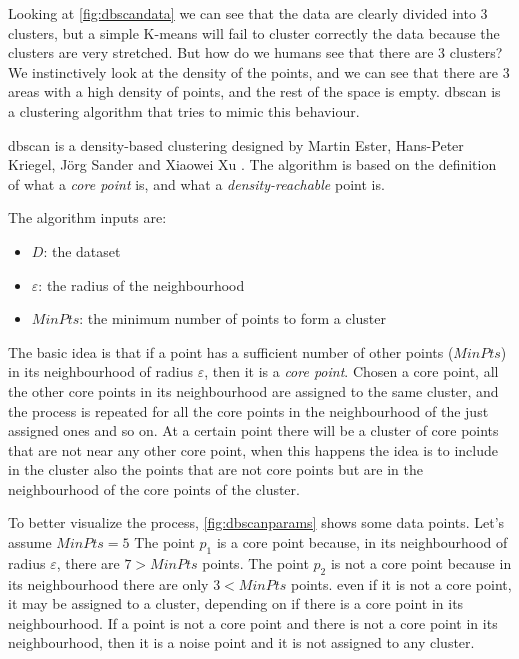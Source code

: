 Looking at \autoref{fig:dbscandata} we can see that the data are clearly divided into $3$ clusters, but a simple K-means will fail to cluster correctly the data because the clusters are very stretched. 
But how do we humans see that there are $3$ clusters? We instinctively look at the density of the points, and we can see that there are $3$ areas with a high density of points, and the rest of the space is empty. \gls{dbscan} is a clustering algorithm that tries to mimic this behaviour.

\gls{dbscan} is a density-based clustering designed by Martin Ester, Hans-Peter Kriegel, Jörg Sander and Xiaowei Xu \cite{dbscan}. The algorithm is based on the definition of what a  \emph{core point} is, and what a \emph{density-reachable} point is.


The algorithm inputs are:
\begin{itemize}
    \item $D$: the dataset
    \item $\varepsilon$: the radius of the neighbourhood
    \item $MinPts$: the minimum number of points to form a cluster
\end{itemize}

The basic idea is that if a point has a sufficient number of other points ($MinPts$) in its neighbourhood of radius $\varepsilon$, then it is a \emph{core point}. Chosen a core point, all the other core points in its neighbourhood are assigned to the same cluster, and the process is repeated for all the core points in the neighbourhood of the just assigned ones and so on. At a certain point there will be a cluster of core points that are not near any other core point, when this happens the idea is to include in the cluster also the points that are not core points but are in the neighbourhood of the core points of the cluster. 

To better visualize the process, \autoref{fig:dbscanparams} shows some data points. Let's assume $MinPts = 5$ The point $p_1$ is a core point because, in its neighbourhood of radius $\varepsilon$, there are $7>MinPts$ points. The point $p_2$ is not a core point because in its neighbourhood there are only $3<MinPts$ points. even if it is not a core point, it may be assigned to a cluster, depending on if there is a core point in its neighbourhood. If a point is not a core point and there is not a core point in its neighbourhood, then it is a noise point and it is not assigned to any cluster. 

